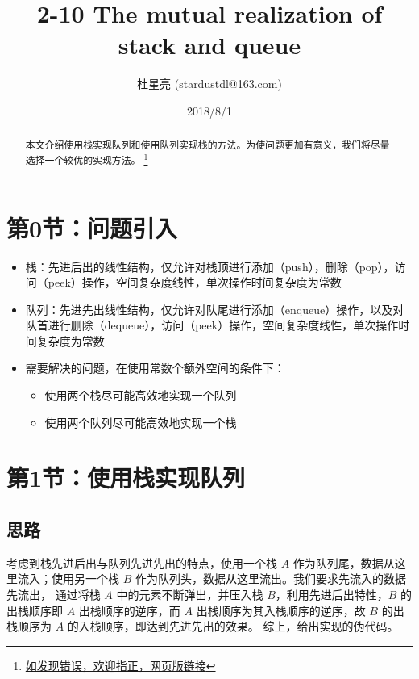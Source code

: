 \documentclass{tufte-handout}
\title{2-10 The mutual realization of stack and queue}
\author[StardustDL]{杜星亮 {\normalsize (stardustdl@163.com)}}
\date{2018/8/1}
\begin{document}
\begin{CJK*}{UTF8}{gbsn}

\maketitle

\begin{abstract}
\noindent 本文介绍使用栈实现队列和使用队列实现栈的方法。为使问题更加有意义，我们将尽量选择一个较优的实现方法。
\footnote{\href{https://stardustdl.github.io/ProblemSolving/2018/08/28/The-mutual-realization-of-stack-and-queue/}{如发现错误，欢迎指正，网页版链接}}
\end{abstract}

\section{第0节：问题引入}
\begin{itemize}
    \item 栈：先进后出的线性结构，仅允许对栈顶进行添加（push），删除（pop），访问（peek）操作，空间复杂度线性，单次操作时间复杂度为常数
    \item 队列：先进先出线性结构，仅允许对队尾进行添加（enqueue）操作，以及对队首进行删除（dequeue），访问（peek）操作，空间复杂度线性，单次操作时间复杂度为常数
    \item 需要解决的问题，在使用常数个额外空间的条件下：
    \begin{itemize}
        \item 使用两个栈尽可能高效地实现一个队列
        \item 使用两个队列尽可能高效地实现一个栈
    \end{itemize}
\end{itemize}

\section{第1节：使用栈实现队列}
\subsection{思路}
考虑到栈先进后出与队列先进先出的特点，使用一个栈 $A$ 作为队列尾，数据从这里流入；使用另一个栈 $B$ 作为队列头，数据从这里流出。我们要求先流入的数据先流出，
通过将栈 $A$ 中的元素不断弹出，并压入栈 $B$，利用先进后出特性，$B$ 的出栈顺序即 $A$ 出栈顺序的逆序，而 $A$ 出栈顺序为其入栈顺序的逆序，故 $B$ 的出栈顺序为 $A$ 的入栈顺序，即达到先进先出的效果。
综上，给出实现的伪代码。


\end{CJK*}
\end{document}
